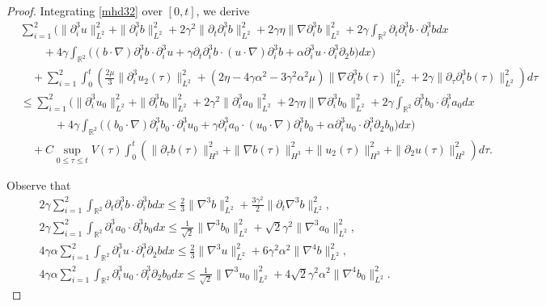 \documentclass[10pt,a4paper]{amsart}
\def\R{\mathbb R}
\begin{document}
\begin{proof}
 Integrating \eqref{mhd32} over $[0,t]$, we derive
\begin{align}\label{s1}
&\sum_{i=1}^2\Big(\|\partial_i^3 u\|^2_{L^2}+\|\partial_i^3 b\|^2_{L^2}+2\gamma^2\|\partial_t\partial_i^3b\|^2_{L^2}
+2\gamma\eta\|\nabla\partial_i^3 b\|^2_{L^2}+2\gamma\int_{\R^2}\partial_t\partial_i^3b\cdot\partial_i^3bdx
\nonumber\\
&\quad\quad+4\gamma\int_{\R^2}\big((b\cdot\nabla)\partial_i^3 b\cdot\partial_i^3 u+\gamma\partial_{t}\partial_i^3b\cdot (u\cdot\nabla)\partial_i^3 b+\alpha\partial_i^3u\cdot\partial_i^3\partial_2 b\big)dx\Big)\nonumber\\
&\quad+\sum_{i=1}^2\int_{0}^t\left(\frac{2\mu}{3}\|\partial_i^3u_2(\tau)\|^2_{L^2}+(2\eta-4\gamma\alpha^2-3\gamma^2\alpha^2\mu)\|\nabla\partial_i^3b(\tau)\|^2_{L^2}+2\gamma\|\partial_{\tau}\partial_i^3b(\tau)\|^2_{L^2}\right)d\tau\nonumber\\
&\leq \sum_{i=1}^2\Big(\|\partial_i^3 u_0\|^2_{L^2}+\|\partial_i^3 b_0\|^2_{L^2}+2\gamma^2\|\partial_i^3a_0\|^2_{L^2}
+2\gamma\eta\|\nabla\partial_i^3 b_0\|^2_{L^2}+2\gamma\int_{\R^2}\partial_i^3b_0\cdot\partial_i^3a_0dx
\nonumber\\
&\quad\qquad+4\gamma\int_{\R^2}\big((b_0\cdot\nabla)\partial_i^3 b_0\cdot\partial_i^3 u_0+\gamma\partial_i^3a_0\cdot (u_0\cdot\nabla)\partial_i^3 b_0+\alpha\partial_i^3u_0\cdot\partial_i^3\partial_2 b_0\big)dx\Big)\nonumber\\
&\quad+C\sup_{0\leq\tau\leq t}V(\tau)\int_{0}^t\left(\|\partial_{\tau} b(\tau)\|_{H^3}^2+\|\nabla b(\tau)\|_{H^3}^2+\|u_2(\tau)\|_{H^3}^2+\|\partial_{2}u(\tau)\|_{H^2}^2\right)d\tau.
\end{align}



 Observe that
\begin{align}
&2\gamma\sum_{i=1}^2\int_{\R^2}\partial_t\partial_i^3b\cdot\partial_i^3bdx
\leq \frac{2}{3}\|\nabla^3b\|_{L^2}^2+\frac{3\gamma^2}{2}\|\partial_t\nabla^3 b\|_{L^2}^2,\label{Y1}\\
&2\gamma\sum_{i=1}^2\int_{\R^2}\partial_i^3a_0\cdot\partial_i^3b_0dx
\leq \frac{1}{\sqrt{2}}\|\nabla^3b_0\|_{L^2}^2+\sqrt{2}\gamma^2\|\nabla^3a_0\|_{L^2}^2,\label{Y2}\\
&4\gamma\alpha\sum_{i=1}^2\int_{\R^2}\partial_i^3u\cdot\partial_i^3\partial_2bdx
\leq \frac{2}{3}\|\nabla^3u\|_{L^2}^2+6\gamma^2\alpha^2\|\nabla^4 b\|_{L^2}^2,\label{Y3}\\
&4\gamma\alpha\sum_{i=1}^2\int_{\R^2}\partial_i^3u_0\cdot\partial_i^3\partial_2b_0dx
\leq \frac{1}{\sqrt{2}}\|\nabla^3u_0\|_{L^2}^2+4\sqrt{2}\gamma^2\alpha^2\|\nabla^4 b_0\|_{L^2}^2.\label{Y4}
\end{align}



\end{proof}
\end{document}
